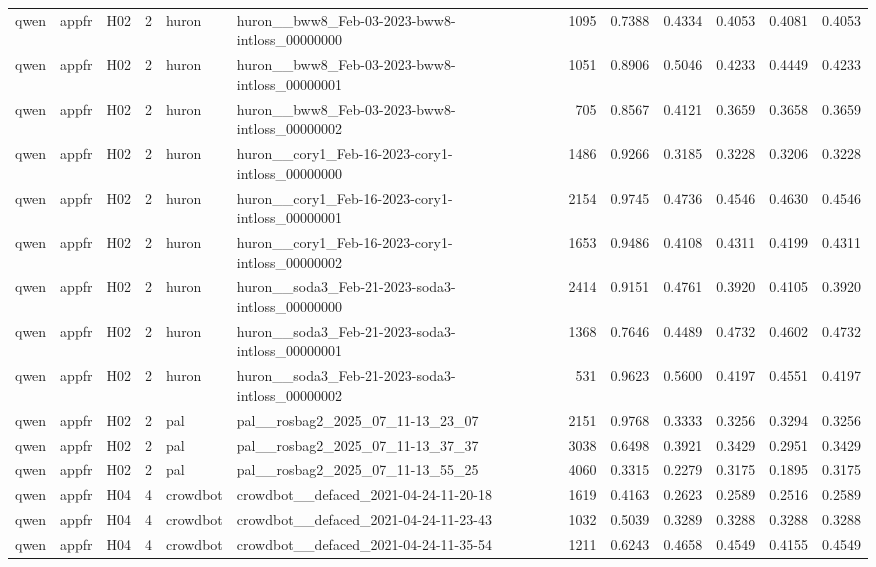 \begin{table}[tbp]
\begin{tabular}{lllrllrrrrrr}
qwen & appfr & H02 & 2 & huron & huron\_\_bww8\_Feb-03-2023-bww8-intloss\_00000000 & 1095 & 0.7388 & 0.4334 & 0.4053 & 0.4081 & 0.4053 \\
qwen & appfr & H02 & 2 & huron & huron\_\_bww8\_Feb-03-2023-bww8-intloss\_00000001 & 1051 & 0.8906 & 0.5046 & 0.4233 & 0.4449 & 0.4233 \\
qwen & appfr & H02 & 2 & huron & huron\_\_bww8\_Feb-03-2023-bww8-intloss\_00000002 & 705 & 0.8567 & 0.4121 & 0.3659 & 0.3658 & 0.3659 \\
qwen & appfr & H02 & 2 & huron & huron\_\_cory1\_Feb-16-2023-cory1-intloss\_00000000 & 1486 & 0.9266 & 0.3185 & 0.3228 & 0.3206 & 0.3228 \\
qwen & appfr & H02 & 2 & huron & huron\_\_cory1\_Feb-16-2023-cory1-intloss\_00000001 & 2154 & 0.9745 & 0.4736 & 0.4546 & 0.4630 & 0.4546 \\
qwen & appfr & H02 & 2 & huron & huron\_\_cory1\_Feb-16-2023-cory1-intloss\_00000002 & 1653 & 0.9486 & 0.4108 & 0.4311 & 0.4199 & 0.4311 \\
qwen & appfr & H02 & 2 & huron & huron\_\_soda3\_Feb-21-2023-soda3-intloss\_00000000 & 2414 & 0.9151 & 0.4761 & 0.3920 & 0.4105 & 0.3920 \\
qwen & appfr & H02 & 2 & huron & huron\_\_soda3\_Feb-21-2023-soda3-intloss\_00000001 & 1368 & 0.7646 & 0.4489 & 0.4732 & 0.4602 & 0.4732 \\
qwen & appfr & H02 & 2 & huron & huron\_\_soda3\_Feb-21-2023-soda3-intloss\_00000002 & 531 & 0.9623 & 0.5600 & 0.4197 & 0.4551 & 0.4197 \\
qwen & appfr & H02 & 2 & pal & pal\_\_rosbag2\_2025\_07\_11-13\_23\_07 & 2151 & 0.9768 & 0.3333 & 0.3256 & 0.3294 & 0.3256 \\
qwen & appfr & H02 & 2 & pal & pal\_\_rosbag2\_2025\_07\_11-13\_37\_37 & 3038 & 0.6498 & 0.3921 & 0.3429 & 0.2951 & 0.3429 \\
qwen & appfr & H02 & 2 & pal & pal\_\_rosbag2\_2025\_07\_11-13\_55\_25 & 4060 & 0.3315 & 0.2279 & 0.3175 & 0.1895 & 0.3175 \\
qwen & appfr & H04 & 4 & crowdbot & crowdbot\_\_defaced\_2021-04-24-11-20-18 & 1619 & 0.4163 & 0.2623 & 0.2589 & 0.2516 & 0.2589 \\
qwen & appfr & H04 & 4 & crowdbot & crowdbot\_\_defaced\_2021-04-24-11-23-43 & 1032 & 0.5039 & 0.3289 & 0.3288 & 0.3288 & 0.3288 \\
qwen & appfr & H04 & 4 & crowdbot & crowdbot\_\_defaced\_2021-04-24-11-35-54 & 1211 & 0.6243 & 0.4658 & 0.4549 & 0.4155 & 0.4549 \\

\end{tabular}
\end{table}
